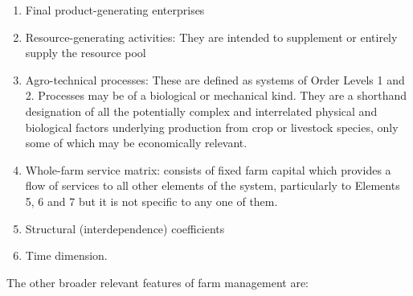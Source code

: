 \documentclass[11pt,]{book}
\theoremstyle{definition}
\theoremstyle{definition}
\theoremstyle{definition}
\theoremstyle{remark}
\begin{document}
\begin{enumerate}
\item
  Final product-generating enterprises
\item
  Resource-generating activities: They are intended to supplement or
  entirely supply the resource pool
\item
  Agro-technical processes: These are defined as systems of Order Levels
  1 and 2. Processes may be of a biological or mechanical kind. They are
  a shorthand designation of all the potentially complex and
  interrelated physical and biological factors underlying production
  from crop or livestock species, only some of which may be economically
  relevant.
\item
  Whole-farm service matrix: consists of fixed farm capital which
  provides a flow of services to all other elements of the system,
  particularly to Elements 5, 6 and 7 but it is not specific to any one
  of them.
\item
  Structural (interdependence) coefficients
\item
  Time dimension.
\end{enumerate}

The other broader relevant features of farm management are:
\end{document}
